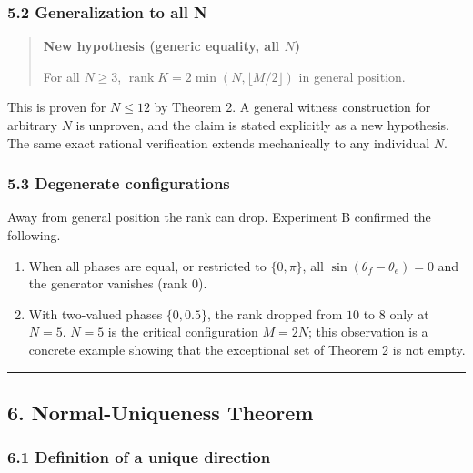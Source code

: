\documentclass[
  a4paper,
]{article}
\providecommand{\tightlist}{%
  \setlength{\itemsep}{0pt}\setlength{\parskip}{0pt}}
\begin{document}
\subsubsection{5.2 Generalization to all
N}\label{generalization-to-all-n}

\begin{quote}
\textbf{New hypothesis (generic equality, all \(N\))}

For all \(N\ge3\), \(\operatorname{rank}K=2\min(N,\lfloor M/2\rfloor)\)
in general position.
\end{quote}

This is proven for \(N\le12\) by Theorem 2. A general witness
construction for arbitrary \(N\) is unproven, and the claim is stated
explicitly as a new hypothesis. The same exact rational verification
extends mechanically to any individual \(N\).

\subsubsection{5.3 Degenerate
configurations}\label{degenerate-configurations}

Away from general position the rank can drop. Experiment B confirmed the
following.

\begin{enumerate}
\def\labelenumi{\arabic{enumi}.}
\tightlist
\item
  When all phases are equal, or restricted to \(\{0,\pi\}\), all
  \(\sin(\theta_f-\theta_e)=0\) and the generator vanishes (rank 0).
\item
  With two-valued phases \(\{0,0.5\}\), the rank dropped from \(10\) to
  \(8\) only at \(N=5\). \(N=5\) is the critical configuration \(M=2N\);
  this observation is a concrete example showing that the exceptional
  set of Theorem 2 is not empty.
\end{enumerate}

\begin{center}\rule{0.5\linewidth}{0.5pt}\end{center}

\subsection{6. Normal-Uniqueness
Theorem}\label{normal-uniqueness-theorem}

\subsubsection{6.1 Definition of a unique
direction}\label{definition-of-a-unique-direction}
\end{document}
